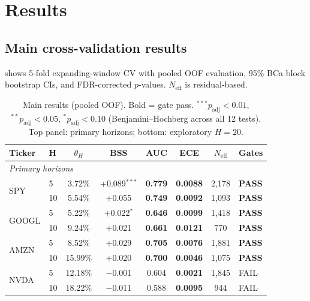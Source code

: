 \documentclass[11pt,a4paper]{article}
\newcommand{\Neff}{N_{\text{eff}}}
\begin{document}
\section{Results}
\label{sec:results}

\subsection{Main cross-validation results}

 shows 5-fold expanding-window CV with pooled OOF evaluation, 95\% BCa block bootstrap CIs, and FDR-corrected $p$-values. $\Neff$ is residual-based.

\begin{table}[htbp]
\centering
\small
\caption{Main results (pooled OOF). Bold = gate pass. $^{***}p_{\text{adj}}<0.01$, $^{**}p_{\text{adj}}<0.05$, $^{*}p_{\text{adj}}<0.10$ (Benjamini--Hochberg across all 12 tests). Top panel: primary horizons; bottom: exploratory $H\!=\!20$.}
\label{tab:main}
\begin{tabular}{llcccccl}
\toprule
Ticker & H & $\theta_H$ & BSS & AUC & ECE & $\Neff$ & Gates \\
\midrule
\multicolumn{8}{l}{\textit{Primary horizons}} \\
\midrule
\multirow{2}{*}{SPY}   & 5  & 3.72\%  & +0.089$^{***}$ & \textbf{0.779} & \textbf{0.0088} & 2{,}178 & \textbf{PASS} \\
                       & 10 & 5.54\%  & +0.055         & \textbf{0.749} & \textbf{0.0092} & 1{,}093 & \textbf{PASS} \\
\multirow{2}{*}{GOOGL} & 5  & 5.22\%  & +0.022$^{*}$   & \textbf{0.646} & \textbf{0.0099} & 1{,}418 & \textbf{PASS} \\
                       & 10 & 9.24\%  & +0.021         & \textbf{0.661} & \textbf{0.0121} &    770  & \textbf{PASS} \\
\multirow{2}{*}{AMZN}  & 5  & 8.52\%  & +0.029         & \textbf{0.705} & \textbf{0.0076} & 1{,}881 & \textbf{PASS} \\
                       & 10 & 15.99\% & +0.020         & \textbf{0.700} & \textbf{0.0046} & 1{,}075 & \textbf{PASS} \\
\multirow{2}{*}{NVDA}  & 5  & 12.18\% & $-$0.001       & 0.604          & \textbf{0.0021} & 1{,}845 & FAIL \\
                       & 10 & 18.22\% & $-$0.011       & 0.588          & \textbf{0.0095} &    944  & FAIL \\

\end{tabular}
\end{table}
\end{document}
